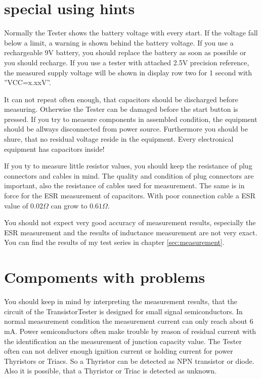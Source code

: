 \section{special using hints}
Normally the Tester shows the battery voltage with every start. If the voltage fall below a limit,
a warning is shown behind the battery voltage. If you use a rechargeable 9V battery, you should replace
the battery as soon as possible or you should recharge.
If you use a tester with attached 2.5V precision reference, the measured supply voltage will be shown
in display row two for 1 second with ''VCC=x.xxV''.

It can not repeat often enough, that capacitors should be discharged before measuring.
Otherwise the Tester can be damaged before the start button is pressed.
If you try to measure components in assembled condition, the equipment should be allways disconnected from power source.
Furthermore you should be shure, that no residual voltage reside in the equipment.
Every electronical equipment has capacitors inside!

If you ty to measure little resistor values, you should keep the resistance of plug connectors and cables in mind.
The quality and condition of plug connectors are important, also the resistance of cables used for measurement.
The same is in force for the ESR measurement of capacitors.
With poor connection cable a ESR value of \(0.02 \Omega\) can grow to \(0.61 \Omega\).

You should not expect very good accuracy of measurement results, especially the ESR measurement and the results of inductance measurement are not very exact.
You can find the results of my test series in chapter \ref{sec:measurement}.

\section{Compoments with problems}
You should keep in mind by interpreting the measurement results, that the circuit of the TransistorTester is
designed for small signal semiconductors. In normal measurement condition the measurement current can only reach about 6 mA.
Power semiconductors often make trouble by reason of residual current with the identification an the measurement of junction capacity value.
The Tester often can not deliver enough ignition current or holding current for power Thyristors or Triacs.
So a Thyristor can be detected as NPN transistor or diode. Also it is possible, that a Thyristor or Triac is detected as unknown.

